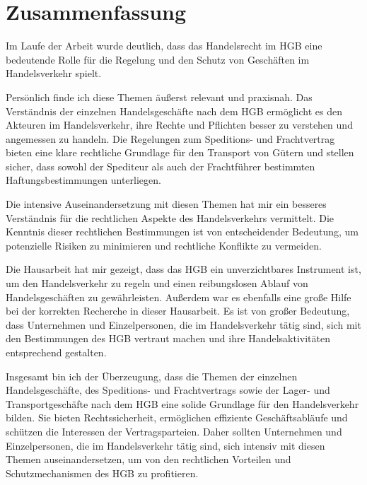\chapter{Zusammenfassung}

Im Laufe der Arbeit wurde deutlich, dass das Handelsrecht im \ac{HGB} eine bedeutende Rolle für die Regelung und den Schutz von Geschäften im Handelsverkehr spielt.

Persönlich finde ich diese Themen äußerst relevant und praxisnah. Das Verständnis der einzelnen Handelsgeschäfte nach dem \ac{HGB} ermöglicht es den Akteuren im Handelsverkehr, ihre Rechte und Pflichten besser zu verstehen und angemessen zu handeln. Die Regelungen zum Speditions- und Frachtvertrag bieten eine klare rechtliche Grundlage für den Transport von Gütern und stellen sicher, dass sowohl der Spediteur als auch der Frachtführer bestimmten Haftungsbestimmungen unterliegen.

Die intensive Auseinandersetzung mit diesen Themen hat mir ein besseres Verständnis für die rechtlichen Aspekte des Handelsverkehrs vermittelt. Die Kenntnis dieser rechtlichen Bestimmungen ist von entscheidender Bedeutung, um potenzielle Risiken zu minimieren und rechtliche Konflikte zu vermeiden.

Die Hausarbeit hat mir gezeigt, dass das \ac{HGB} ein unverzichtbares Instrument ist, um den Handelsverkehr zu regeln und einen reibungslosen Ablauf von Handelsgeschäften zu gewährleisten. Außerdem war es ebenfalls eine große Hilfe bei der korrekten Recherche in dieser Hausarbeit. Es ist von großer Bedeutung, dass Unternehmen und Einzelpersonen, die im Handelsverkehr tätig sind, sich mit den Bestimmungen des HGB vertraut machen und ihre Handelsaktivitäten entsprechend gestalten.

Insgesamt bin ich der Überzeugung, dass die Themen der einzelnen Handelsgeschäfte, des Speditions- und Frachtvertrags sowie der Lager- und Transportgeschäfte nach dem \ac{HGB} eine solide Grundlage für den Handelsverkehr bilden. Sie bieten Rechtssicherheit, ermöglichen effiziente Geschäftsabläufe und schützen die Interessen der Vertragsparteien. Daher sollten Unternehmen und Einzelpersonen, die im Handelsverkehr tätig sind, sich intensiv mit diesen Themen auseinandersetzen, um von den rechtlichen Vorteilen und Schutzmechanismen des HGB zu profitieren.


